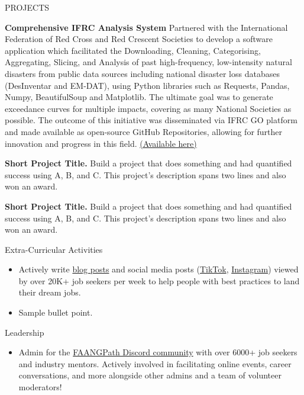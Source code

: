 \documentclass{resume} %
\begin{document}
\begin{rSection}{PROJECTS}
\vspace{-1.25em}
\item \textbf{Comprehensive IFRC Analysis System} {Partnered with the International Federation of Red Cross and Red Crescent Societies to develop a software application which facilitated the Downloading, Cleaning, Categorising, Aggregating, Slicing, and Analysis of past high-frequency, low-intensity natural disasters from public data sources including national disaster loss databases (DesInventar and EM-DAT), using Python libraries such as Requests, Pandas, Numpy, BeautifulSoup and Matplotlib. The ultimate goal was to generate exceedance curves for multiple impacts, covering as many National Societies as possible. The outcome of this initiative was disseminated via IFRC GO platform and made available as open-source GitHub Repositories, allowing for further innovation and progress in this field. \href{https://github.com/COMP0016-IFRC-Team5/}{(Available here)}}
\item \textbf{Short Project Title.} {Build a project that does something and had quantified success using A, B, and C. This project's description spans two lines and also won an award.}
\item \textbf{Short Project Title.} {Build a project that does something and had quantified success using A, B, and C. This project's description spans two lines and also won an award.}
\end{rSection} 

\begin{rSection}{Extra-Curricular Activities} 
\begin{itemize}
    \item 	Actively write \href{https://www.faangpath.com/blog/}{blog posts} and social media posts (\href{https://www.tiktok.com/@faangpath}{TikTok}, \href{https://www.instagram.com/faangpath/?hl=en}{Instagram}) viewed by over 20K+ job seekers per week to help people with best practices to land their dream jobs. 
    \item	Sample bullet point.
\end{itemize}


\end{rSection}

\begin{rSection}{Leadership} 
\begin{itemize}
    \item Admin for the \href{https://discord.com/invite/WWbjEaZ}{FAANGPath Discord community} with over 6000+ job seekers and industry mentors. Actively involved in facilitating online events, career conversations, and more alongside other admins and a team of volunteer moderators! 
\end{itemize}


\end{rSection}
\end{document}
